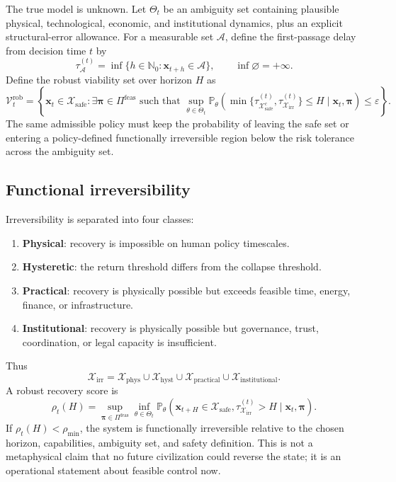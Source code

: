 \documentclass[11pt,a4paper]{article}
\numberwithin{equation}{section}
\theoremstyle{definition}
\theoremstyle{plain}
\theoremstyle{remark}
\newcommand{\Pp}{\mathbb{P}}
\newcommand{\safe}{\mathcal{X}_{\mathrm{safe}}}
\newcommand{\irrev}{\mathcal{X}_{\mathrm{irr}}}
\newcommand{\policy}{\boldsymbol{\pi}}
\newcommand{\state}{\bm{x}}
\begin{document}
The true model is unknown. Let $\Theta_t$ be an ambiguity set containing plausible physical, technological, economic, and institutional dynamics, plus an explicit structural-error allowance. For a measurable set $\mathcal A$, define the first-passage delay from decision time $t$ by
\begin{equation}
\tau_{\mathcal A}^{(t)}=
\inf\{h\in\mathbb N_0:\state_{t+h}\in\mathcal A\},
\qquad \inf\varnothing=+\infty.
\label{eq:firstpassage}
\end{equation}
Define the robust viability set over horizon $H$ as
\begin{equation}
\mathcal V_t^{\mathrm{rob}}=
\left\{
\state_t\in\safe:
\exists\policy\in\Pi^{\mathrm{feas}}
\text{ such that }
\sup_{\theta\in\Theta_t}
\Pp_{\theta}\!\left(
\min\{\tau_{\safe^{c}}^{(t)},\tau_{\irrev}^{(t)}\}\le H
\mid\state_t,\policy
\right)
\le\varepsilon
\right\}.
\label{eq:robustviability}
\end{equation}
The same admissible policy must keep the probability of leaving the safe set or entering a policy-defined functionally irreversible region below the risk tolerance across the ambiguity set.

\subsection{Functional irreversibility}

Irreversibility is separated into four classes:
\begin{enumerate}
  \item \textbf{Physical}: recovery is impossible on human policy timescales.
  \item \textbf{Hysteretic}: the return threshold differs from the collapse threshold.
  \item \textbf{Practical}: recovery is physically possible but exceeds feasible time, energy, finance, or infrastructure.
  \item \textbf{Institutional}: recovery is physically possible but governance, trust, coordination, or legal capacity is insufficient.
\end{enumerate}
Thus
\begin{equation}
\irrev=
\mathcal X_{\mathrm{phys}}
\cup\mathcal X_{\mathrm{hyst}}
\cup\mathcal X_{\mathrm{practical}}
\cup\mathcal X_{\mathrm{institutional}}.
\end{equation}
A robust recovery score is
\begin{equation}
\rho_t(H)=
\sup_{\policy\in\Pi^{\mathrm{feas}}}
\inf_{\theta\in\Theta_t}
\Pp_{\theta}
\left(
\state_{t+H}\in\safe,
\tau_{\irrev}^{(t)}>H
\mid \state_t,\policy
\right).
\label{eq:recoverability}
\end{equation}
If $\rho_t(H)<\rho_{\min}$, the system is functionally irreversible relative to the chosen horizon, capabilities, ambiguity set, and safety definition. This is not a metaphysical claim that no future civilization could reverse the state; it is an operational statement about feasible control now.
\end{document}
